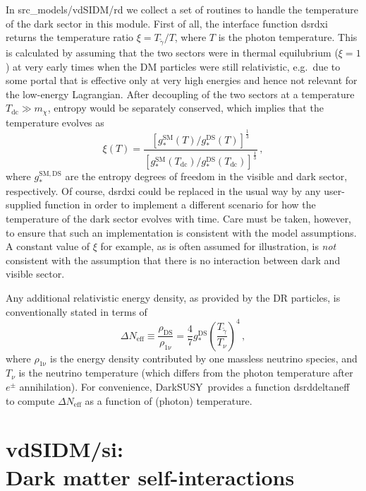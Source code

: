 \documentclass[a4paper,10pt,oneside]{book}
\newcommand{\be}{\begin{equation}}
\newcommand{\ee}{\end{equation}}
\newcommand{\code}[1]{\ft{#1}}
\newcommand{\codeb}[1]{\ftb{#1}}
\newcommand{\ds}{{\sffamily DarkSUSY}}
\newcommand{\ft}[1]{\textsf{#1}}
\newcommand{\ftb}[1]{{\bfseries \sffamily #1}}
\begin{document}
In \code{src\_models/vdSIDM/rd} we collect a set of routines to handle the temperature of the dark sector
in this module. First of all, the interface function \code{dsrdxi} returns the temperature ratio $\xi=T_{\tilde\gamma}/T$,
where $T$ is the photon temperature. This is calculated by assuming that the two sectors were  in thermal
equilubrium ($\xi=1$) at very early times when the DM particles were still relativistic, e.g.~due to some portal
that is effective only at very high energies and hence not relevant for the low-energy Lagrangian. 
After decoupling of the two sectors at a temperature $T_\mathrm{dc}\gg m_\chi$, 
entropy would be separately conserved, which implies that the temperature evolves as 
\be
 \xi(T) = 
 \frac{\left[{g_*^\mathrm{SM}}(T)/{g_*^\mathrm{DS}(T)}\right]^\frac13}
 {\left[{g_*^\mathrm{SM}}(T_\mathrm{dc})/{g_*^\mathrm{DS}(T_\mathrm{dc})}\right]^\frac13}\,,
 \ee
where $g_*^{\mathrm{SM}, \mathrm{DS}}$ are the entropy degrees of freedom in the visible
and dark sector, respectively. Of course,  \code{dsrdxi} could be replaced in the usual way by any user-supplied function 
in order to implement a different scenario for how the temperature of the dark sector evolves with time.
Care must be taken, however, to ensure that such an implementation is consistent with the model assumptions.
A constant value of $\xi$ for example, as is often assumed for illustration, is {\it not} consistent with the assumption
that there is no interaction between dark and visible sector.

Any additional relativistic energy density, as provided by the DR particles, is conventionally stated in terms of
\be
 \Delta N_\mathrm{eff}\equiv \frac{\rho_\mathrm{DS}}{\rho_\mathrm{1\nu}}=  
 \frac47g_*^\mathrm{DS}\left(\frac{T_{\tilde\gamma}}{T_\nu}\right)^4\,,
\ee
where $\rho_\mathrm{1\nu}$ is the energy density contributed by one massless neutrino species, and $T_\nu$ is the neutrino
temperature (which differs from the photon temperature after $e^\pm$ annihilation). For convenience, \ds\ provides a 
function \code{dsrddeltaneff} to compute $\Delta N_\mathrm{eff}$ as a function of (photon) temperature.

\section[vdSIDM/si: Dark matter self-interactions]{\codeb{vdSIDM/si}:\\ Dark matter self-interactions}
\label{sec:src_models/vdSIDM/si}
\end{document}
